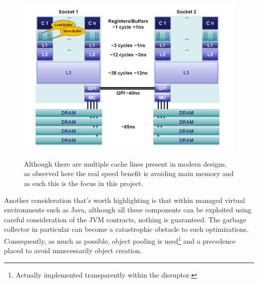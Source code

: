 \documentclass[a4paper,11pt]{scrreprt}
\begin{document}
\begin{figure}[h!]
\centering
\caption{Although there are multiple cache lines present in modern designs, as observed here the real speed benefit is avoiding main memory and as such this is the focus in this project.}
\includegraphics[scale=0.5] {cachelinespeed.png}
\label{fig:cachelinespeeds}
\end{figure}
Another consideration that's worth highlighting is that within managed virtual environments such as Java, although all these components can be exploited using careful consideration of the JVM contracts, nothing is guaranteed. The garbage collector in particular can become a catastrophic obstacle to such optimizations. Consequently, as much as possible, object pooling is used\footnote{Actually implemented transparently within the disruptor.} and a precedence placed to avoid unnecessarily object creation.
\end{document}
